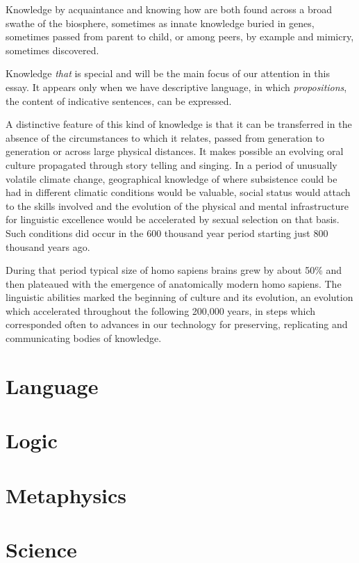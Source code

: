\documentclass[10pt,titlepage]{article}
\begin{document}
Knowledge by acquaintance and knowing how are both found across a broad swathe of the biosphere, sometimes as innate knowledge buried in genes, sometimes passed from parent to child, or among peers, by example and mimicry, sometimes discovered.

Knowledge \emph{that} is special and will be the main focus of our attention in this essay.
It appears only when we have descriptive language, in which \emph{propositions}, the content of indicative sentences, can be expressed.

A distinctive feature of this kind of knowledge is that it can be transferred in the absence of the circumstances to which it relates, passed from generation to generation or across large physical distances.
It makes possible an evolving oral culture propagated through story telling and singing.
In a period of unusually volatile climate change, geographical knowledge of where subsistence could be had in different climatic conditions would be valuable, social status would attach to the skills involved and the evolution of the physical and mental infrastructure for linguistic excellence would be accelerated by sexual selection on that basis.
Such conditions did occur in the 600 thousand year period starting just 800 thousand years ago.

During that period typical size of homo sapiens brains grew by about 50\% and then plateaued with the emergence of anatomically modern homo sapiens.
The linguistic abilities marked the beginning of culture and its evolution, an evolution which accelerated throughout the following 200,000 years, in steps which corresponded often to advances in our technology for preserving, replicating and communicating bodies of knowledge.


\section{Language}

\section{Logic}

\section{Metaphysics}

\section{Science}
\end{document}
